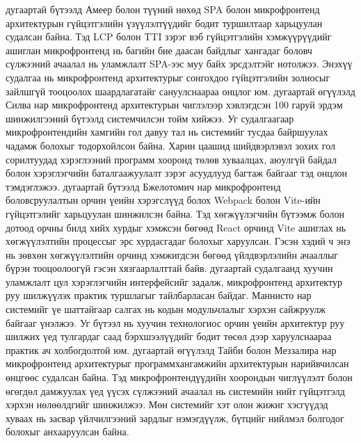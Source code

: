 \hspace*{1cm}\cite{ameer2024} дугаартай бүтээлд Амеер болон түүний нөхөд SPA болон микрофронтенд архитектурын гүйцэтгэлийн үзүүлэлтүүдийг бодит туршилтаар харьцуулан судалсан байна. Тэд LCP болон TTI зэрэг вэб гүйцэтгэлийн хэмжүүрүүдийг ашиглан микрофронтенд нь багийн бие даасан байдлыг хангадаг боловч сүлжээний ачаалал нь уламжлалт SPA-ээс муу байх эрсдэлтэйг нотолжээ. Энэхүү судалгаа нь микрофронтенд архитектурыг сонгохдоо гүйцэтгэлийн золиосыг зайлшгүй тооцоолох шаардлагатайг сануулснаараа онцлог юм.
\newline
\hspace*{1cm}\cite{silva2024} дугаартай өгүүлэлд Силва нар микрофронтенд архитектурын чиглэлээр хэвлэгдсэн 100 гаруй эрдэм шинжилгээний бүтээлд системчилсэн тойм хийжээ. Уг судалгаагаар микрофронтендийн хамгийн гол давуу тал нь системийг тусдаа байршуулах чадамж болохыг тодорхойлсон байна. Харин цаашид шийдвэрлэвэл зохих гол сорилтуудад хэрэглээний программ хооронд төлөв хуваалцах, аюулгүй байдал болон хэрэглэгчийн баталгаажуулалт зэрэг асуудлууд багтаж байгааг тэд онцлон тэмдэглэжээ.
\newline
\hspace*{1cm}\cite{bjelotomic2024} дугаартай бүтээлд Бжелотомич нар микрофронтенд боловсруулалтын орчин үеийн хэрэгслүүд болох Webpack болон Vite-ийн гүйцэтгэлийг харьцуулан шинжилсэн байна. Тэд хөгжүүлэгчийн бүтээмж болон дотоод орчны билд хийх хурдыг хэмжсэн бөгөөд React орчинд Vite ашиглах нь хөгжүүлэлтийн процессыг эрс хурдасгадаг болохыг харуулсан. Гэсэн хэдий ч энэ нь зөвхөн хөгжүүлэлтийн орчинд хэмжигдсэн бөгөөд үйлдвэрлэлийн ачааллыг бүрэн тооцоолоогүй гэсэн хязгаарлалттай байв.
\newline
\hspace*{1cm}\cite{mannisto2023} дугаартай судалгаанд хуучин уламжлалт цул хэрэглэгчийн интерфейсийг задалж, микрофронтенд архитектур руу шилжүүлэх практик туршлагыг тайлбарласан байдаг. Маннисто нар системийг үе шаттайгаар салгах нь кодын модульчлалыг хэрхэн сайжруулж байгааг үнэлжээ. Уг бүтээл нь хуучин технологиос орчин үеийн архитектур руу шилжих үед тулгардаг саад бэрхшээлүүдийг бодит төсөл дээр харуулснаараа практик ач холбогдолтой юм.
\newline
\hspace*{1cm}\cite{taibi2022} дугаартай өгүүлэлд Тайби болон Меззалира нар микрофронтенд архитектурыг программхангамжийн архитектурын нарийвчилсан өнцгөөс судалсан байна. Тэд микрофронтендүүдийн хоорондын чиглүүлэлт болон өгөгдөл дамжуулах үед үүсэх сүлжээний ачаалал нь системийн нийт гүйцэтгэлд хэрхэн нөлөөлдгийг шинжилжээ. Мөн системийг хэт олон жижиг хэсгүүдэд хуваах нь засвар үйлчилгээний зардлыг нэмэгдүүлж, бүтцийг нийлмэл болгодог болохыг анхааруулсан байна.

